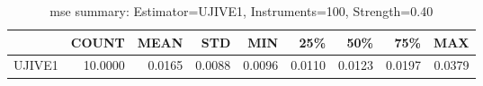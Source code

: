 \begin{table}[ht]
\centering
\caption{mse summary: Estimator=UJIVE1, Instruments=100, Strength=0.40}
\begin{tabular}{lrrrrrrrr}
\toprule
 & COUNT & MEAN & STD & MIN & 25\% & 50\% & 75\% & MAX \\
\midrule
UJIVE1 & 10.0000 & 0.0165 & 0.0088 & 0.0096 & 0.0110 & 0.0123 & 0.0197 & 0.0379 \\
\bottomrule
\end{tabular}
\end{table}
